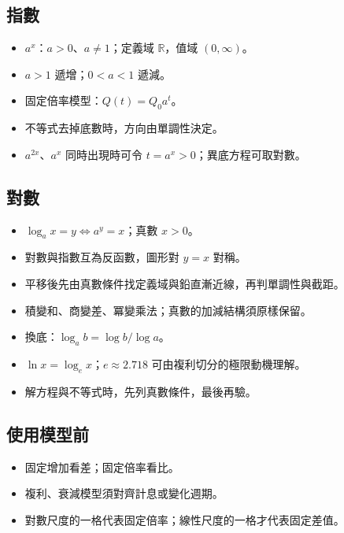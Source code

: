\documentclass[11pt,a4paper]{article}
\providecommand{\tightlist}{%
  \setlength{\itemsep}{0pt}\setlength{\parskip}{0pt}}
\begin{document}
\subsection{指數}\label{ux6307ux6578}

\begin{itemize}
\tightlist
\item
  \(a^x\)：\(a>0\)、\(a\ne1\)；定義域 \(\mathbb R\)，值域 \((0,\infty)\)。
\item
  \(a>1\) 遞增；\(0<a<1\) 遞減。
\item
  固定倍率模型：\(Q(t)=Q_0a^t\)。
\item
  不等式去掉底數時，方向由單調性決定。
\item
  \(a^{2x}\)、\(a^x\) 同時出現時可令 \(t=a^x>0\)；異底方程可取對數。
\end{itemize}

\subsection{對數}\label{ux5c0dux6578}

\begin{itemize}
\tightlist
\item
  \(\log_ax=y\iff a^y=x\)；真數 \(x>0\)。
\item
  對數與指數互為反函數，圖形對 \(y=x\) 對稱。
\item
  平移後先由真數條件找定義域與鉛直漸近線，再判單調性與截距。
\item
  積變和、商變差、冪變乘法；真數的加減結構須原樣保留。
\item
  換底：\(\log_ab=\log b/\log a\)。
\item
  \(\ln x=\log_e x\)；\(e\approx2.718\) 可由複利切分的極限動機理解。
\item
  解方程與不等式時，先列真數條件，最後再驗。
\end{itemize}

\subsection{使用模型前}\label{ux4f7fux7528ux6a21ux578bux524d}

\begin{itemize}
\tightlist
\item
  固定增加看差；固定倍率看比。
\item
  複利、衰減模型須對齊計息或變化週期。
\item
  對數尺度的一格代表固定倍率；線性尺度的一格才代表固定差值。
\end{itemize}
\end{document}
